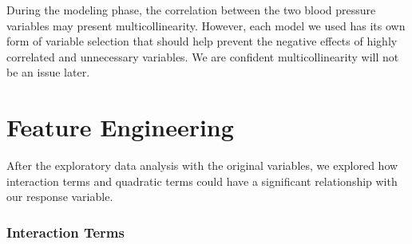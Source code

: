 \documentclass[10pt]{article}
\begin{document}
\begin{figure}[hbt!]
\hspace*{\fill}
\centering
{}\hspace{2em}
%
\hspace*{\fill}
\end{figure}
 
During the modeling phase, the correlation between the two blood pressure variables may present multicollinearity. However, each model we used has its own form of variable selection that should help prevent the negative effects of highly correlated and unnecessary variables. We are confident multicollinearity will not be an issue later.


\section*{Feature Engineering}

After the exploratory data analysis with the original variables, we explored how interaction terms and quadratic terms could have a significant relationship with our response variable. 

\subsubsection*{Interaction Terms}
\end{document}
